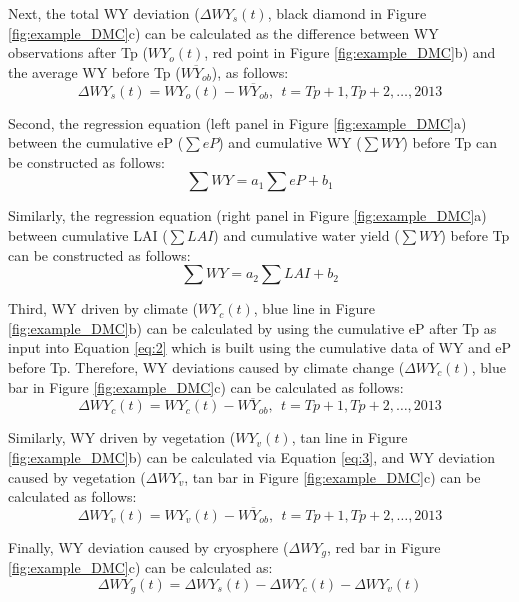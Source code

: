 \documentclass[hess, manuscript]{copernicus}
\begin{document}
Next, the total WY deviation ($\Delta WY_s(t)$, black diamond in Figure \ref{fig:example_DMC}c) can be calculated as the difference between WY observations after Tp ($WY_o(t)$, red point in Figure \ref{fig:example_DMC}b) and the average WY before Tp ($\overline{WY_{ob}}$), as follows:
\begin{equation} 
    \Delta WY_s(t)=WY_o(t)-\overline{WY_{ob}}, \ \  t=Tp+1, Tp+2, \ldots, 2013
\end{equation}

Second, the regression equation (left panel in Figure \ref{fig:example_DMC}a) between the cumulative eP ($\sum eP$) and cumulative WY ($\sum WY$) before Tp can be constructed as follows:
\begin{equation} \label{eq:2}
    \sum WY = a_1\sum eP + b_1
\end{equation} 

Similarly, the regression equation (right panel in Figure \ref{fig:example_DMC}a) between cumulative LAI ($\sum LAI$) and cumulative water yield ($\sum WY$) before Tp can be constructed as follows:
\begin{equation} \label{eq:3}
    \sum WY = a_2\sum LAI + b_2
\end{equation}

Third, WY driven by climate ($WY_c(t)$, blue line in Figure \ref{fig:example_DMC}b) can be calculated by using the cumulative eP after Tp as input into Equation \ref{eq:2} which is built using the cumulative data of WY and eP before Tp. Therefore, WY deviations caused by climate change ($\Delta WY_c(t)$, blue bar in Figure \ref{fig:example_DMC}c) can be calculated as follows:
\begin{equation}
    \Delta WY_{c}(t)=WY_{c}(t)-\overline{WY_{ob}}, \ \  t=Tp+1, Tp+2, \ldots, 2013
\end{equation}

Similarly, WY driven by vegetation ($WY_v(t)$, tan line in Figure \ref{fig:example_DMC}b) can be calculated via Equation \ref{eq:3}, and WY deviation caused by vegetation ($\Delta WY_v$, tan bar in Figure \ref{fig:example_DMC}c) can be calculated as follows:
\begin{equation}
    \Delta WY_{v}(t)=WY_{v}(t)-\overline{WY_{ob}}, \ \ t=Tp+1, Tp+2, \ldots, 2013
\end{equation}

Finally, WY deviation caused by cryosphere ($\Delta WY_g$, red bar in Figure \ref{fig:example_DMC}c) can be calculated as:
\begin{equation}
    \Delta WY_{g}(t)=\Delta WY_s(t)-\Delta WY_{c}(t)-\Delta WY_{v}(t)
\end{equation}
\end{document}
